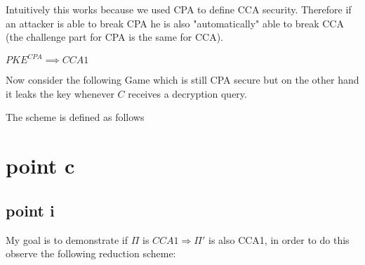 \noindent Intuitively this works because we used CPA to define CCA security. Therefore if an attacker is able to break CPA he is also "automatically" able to break CCA (the challenge part for CPA is the same for CCA).

\bigskip
$PKE^{CPA} \implies CCA1$

Now consider the following Game which is still CPA secure but on the other hand it leaks the key whenever $C$ receives a decryption query.

The scheme is defined as follows
\begin{figure}[h!]
    \centering
    \sdinit{}
\end{figure}

\newpage
\section{point c}
\subsection{point i}

My goal is to demonstrate if $\Pi$ is $CCA1 \Rightarrow \Pi'$ is also CCA1, in order to do this observe the following reduction scheme:

